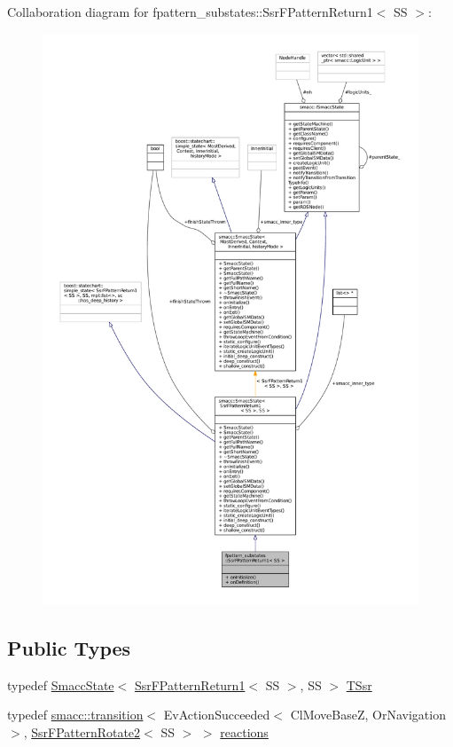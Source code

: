 Collaboration diagram for fpattern\+\_\+substates\+:\+:Ssr\+F\+Pattern\+Return1$<$ SS $>$\+:
\nopagebreak
\begin{figure}[H]
\begin{center}
\leavevmode
\includegraphics[width=350pt]{structfpattern__substates_1_1SsrFPatternReturn1__coll__graph}
\end{center}
\end{figure}
\subsection*{Public Types}
\begin{DoxyCompactItemize}
\item 
typedef \hyperlink{classSmaccState}{Smacc\+State}$<$ \hyperlink{structfpattern__substates_1_1SsrFPatternReturn1}{Ssr\+F\+Pattern\+Return1}$<$ SS $>$, SS $>$ \hyperlink{structfpattern__substates_1_1SsrFPatternReturn1_a50f9750abde55c952316c66699d1e233}{T\+Ssr}
\item 
typedef \hyperlink{classsmacc_1_1transition}{smacc\+::transition}$<$ Ev\+Action\+Succeeded$<$ Cl\+Move\+BaseZ, Or\+Navigation $>$, \hyperlink{structfpattern__substates_1_1SsrFPatternRotate2}{Ssr\+F\+Pattern\+Rotate2}$<$ SS $>$ $>$ \hyperlink{structfpattern__substates_1_1SsrFPatternReturn1_a40d1cd639b659d850e4bc49a3924773b}{reactions}
\end{DoxyCompactItemize}
